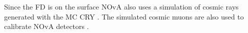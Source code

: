 


Since the \gls{FD} is on the surface \gls{NOvA} also uses a simulation of cosmic rays generated with the \gls{MC} \gls{CRY} \cite{CRY}. The simulated cosmic muons are also used to calibrate \gls{NOvA} detectors \cite{NuMIFlux.pdf}. 

